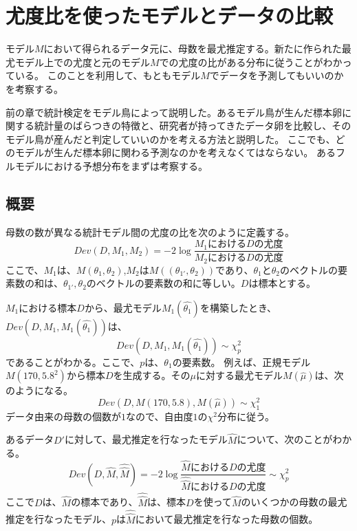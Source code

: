 \chapter{尤度比を使ったモデルとデータの比較}
モデル$M$において得られるデータ元に、母数を最尤推定する。新たに作られた最尤モデル上での尤度と元のモデル$M$での尤度の比がある分布に従うことがわかっている。
このことを利用して、もともモデル$M$でデータを予測してもいいのかを考察する。

前の章で統計検定をモデル鳥によって説明した。あるモデル鳥が生んだ標本卵に関する統計量のばらつきの特徴と、研究者が持ってきたデータ卵を比較し、そのモデル鳥が産んだと判定していいのかを考える方法と説明した。
ここでも、どのモデルが生んだ標本卵に関わる予測なのかを考えなくてはならない。
あるフルモデルにおける予想分布をまずは考察する。

\section{概要}

\begin{defi}
    母数の数が異なる統計モデル間の尤度の比を次のように定義する。
    \begin{equation*}
        Dev(D,M_1,M_2) = -2\log\frac{M_1におけるDの尤度}{M_2におけるDの尤度}
    \end{equation*}
    ここで、$M_1$は、$M(\theta_1,\theta_2)$,$M_2$は$M((\theta_{1'},\theta_2))$であり、$\theta_1$と$\theta_2$のベクトルの要素数の和は、$\theta_{1'},\theta_2$のベクトルの要素数の和に等しい。$D$は標本とする。

\end{defi}

$M_1$における標本$D$から、最尤モデル$M_1(\hat{\theta_1})$を構築したとき、$Dev(D,M_1,M_1(\hat{\theta_1}))$は、
\begin{equation*}
    Dev(D,M_1,M_1(\hat{\theta_1})) \sim \chi^2_{p}
\end{equation*}
であることがわかる。ここで、$p$は、$\theta_1$の要素数。
例えば、正規モデル$M(170,5.8^2)$から標本$D$を生成する。その$\mu$に対する最尤モデル$M(\hat{\mu})$は、次のようになる。
\begin{equation*}
    Dev(D,M(170,5.8),M(\hat{\mu})) \sim \chi^2_1
\end{equation*}
データ由来の母数の個数が$1$なので、自由度$1$の$\chi^2$分布に従う。

あるデータ$D'$に対して、最尤推定を行なったモデル$\hat{M}$について、次のことがわかる。
\begin{equation*}
    Dev(D,\hat{M},\hat{\hat{M}}) = -2\log\frac{\hat{M}におけるDの尤度}{\hat{\hat{M}}におけるDの尤度} \sim \chi^2_{p}
\end{equation*}
ここで$D$は、$\hat{M}$の標本であり、$\hat{\hat{M}}$は、標本$D$を使って$\hat{M}$のいくつかの母数の最尤推定を行なったモデル、$p$は$\hat{\hat{M}}$において最尤推定を行なった母数の個数。

